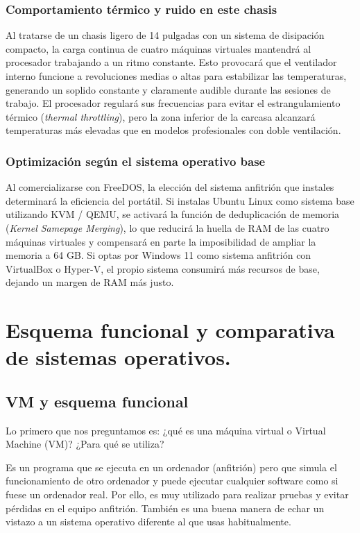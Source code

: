 \documentclass[11.5pt]{article}
\begin{document}
	\subsubsection*{Comportamiento térmico y ruido en este chasis}
	
	Al tratarse de un chasis ligero de 14 pulgadas con un sistema de disipación compacto, la carga continua de cuatro máquinas virtuales mantendrá al procesador trabajando a un ritmo constante. Esto provocará que el ventilador interno funcione a revoluciones medias o altas para estabilizar las temperaturas, generando un soplido constante y claramente audible durante las sesiones de trabajo. El procesador regulará sus frecuencias para evitar el estrangulamiento térmico (\textit{thermal throttling}), pero la zona inferior de la carcasa alcanzará temperaturas más elevadas que en modelos profesionales con doble ventilación.
	
	\subsubsection*{Optimización según el sistema operativo base}
	
	Al comercializarse con FreeDOS, la elección del sistema anfitrión que instales determinará la eficiencia del portátil. Si instalas Ubuntu Linux como sistema base utilizando KVM / QEMU, se activará la función de deduplicación de memoria (\textit{Kernel Samepage Merging}), lo que reducirá la huella de RAM de las cuatro máquinas virtuales y compensará en parte la imposibilidad de ampliar la memoria a 64 GB. Si optas por Windows 11 como sistema anfitrión con VirtualBox o Hyper-V, el propio sistema consumirá más recursos de base, dejando un margen de RAM más justo.
	
	\section{Esquema funcional y comparativa de sistemas operativos.}
	
	
	
	\subsection{VM y esquema funcional}
	
	Lo primero que nos preguntamos es: ¿qué es una máquina virtual o Virtual Machine (VM)? ¿Para qué se utiliza?
	
	Es un programa que se ejecuta en un ordenador (anfitrión) pero que simula el funcionamiento de otro ordenador y puede ejecutar cualquier software como si fuese un ordenador real. Por ello, es muy utilizado para realizar pruebas y evitar pérdidas en el equipo anfitrión. También es una buena manera de echar un vistazo a un sistema operativo diferente al que usas habitualmente.
	
\end{document}
